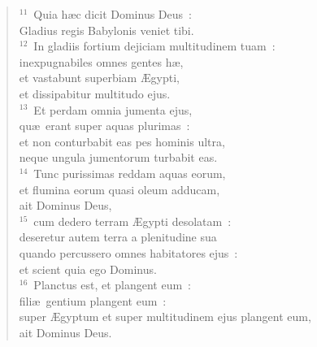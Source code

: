 \begin{verse}
${}^{11}$~Quia h\ae c dicit Dominus Deus~:\\ Gladius regis Babylonis veniet tibi.\\
${}^{12}$~In gladiis fortium dejiciam multitudinem tuam~:\\ inexpugnabiles omnes gentes h\ae ,\\ et vastabunt superbiam \AE gypti,\\ et dissipabitur multitudo ejus.\\
${}^{13}$~Et perdam omnia jumenta ejus,\\ qu\ae\ erant super aquas plurimas~:\\ et non conturbabit eas pes hominis ultra,\\ neque ungula jumentorum turbabit eas.\\
${}^{14}$~Tunc purissimas reddam aquas eorum,\\ et flumina eorum quasi oleum adducam,\\ ait Dominus Deus,\\
${}^{15}$~cum dedero terram \AE gypti desolatam~:\\ deseretur autem terra a plenitudine sua\\ quando percussero omnes habitatores ejus~:\\ et scient quia ego Dominus.\\
${}^{16}$~Planctus est, et plangent eum~:\\ fili\ae\ gentium plangent eum~:\\ super \AE gyptum et super multitudinem ejus plangent eum,\\ ait Dominus Deus.\end{verse}



